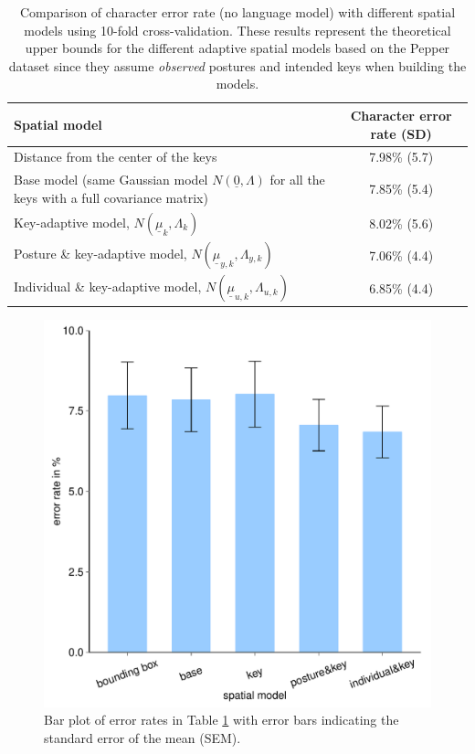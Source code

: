 \documentclass{sigchi}
\newcommand\tabhead[1]{\small\textbf{#1}}
\begin{document}
\begin{table} [tb]
  \centering
  \begin{tabular}{|l|c|}
    \hline
    \tabhead{Spatial model} &
    \multicolumn{1}{|p{0.2\columnwidth}|}{\centering\tabhead{Character
    error rate (SD)}} \\
    \hline
    Distance from the center of the keys & 7.98\% (5.7) \\
    \hline
    \multicolumn{1}{|p{0.7\columnwidth}|}{Base model (same Gaussian model $N(\underline 0, \Lambda)$ for
    all the keys with a full covariance matrix)} & 7.85\% (5.4) \\
    \hline
    \multicolumn{1}{|p{0.7\columnwidth}|}{Key-adaptive model, $N(\underline
    \mu_k, \Lambda_k)$} & 8.02\% (5.6) \\
    \hline
    \multicolumn{1}{|p{0.7\columnwidth}|}{Posture \& key-adaptive model,
    $N(\underline \mu_{y,k}, \Lambda_{y,k})$} & 7.06\% (4.4) \\
    \hline
     \multicolumn{1}{|p{0.7\columnwidth}|}{Individual \& key-adaptive model,
     $N(\underline \mu_{u,k}, \Lambda_{u,k})$} & 6.85\% (4.4) \\
    \hline
  \end{tabular}
  \caption{Comparison of character error rate (no language model) with
  different spatial models using 10-fold cross-validation. These results
  represent the theoretical upper bounds for the different adaptive spatial models based on 
  the Pepper dataset since they assume \textit{observed} postures and intended
  keys when building the models.}
  \label{tab:comparison}
\end{table}

\begin{figure}[tb]
  \centering
  \includegraphics[width=0.8\columnwidth,
  height=0.6\columnwidth]{figures/error-rates.pdf}
  \caption{Bar plot of error rates in Table \ref{tab:comparison} with error bars
  indicating the standard error of the mean (SEM).}
  \label{fig:error-bar1}
\end{figure}
\end{document}

